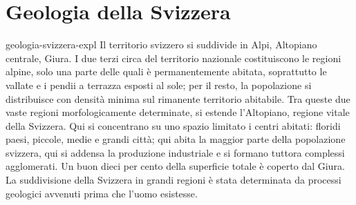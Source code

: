 \documentclass[preview]{standalone}
\begin{document}
\genpage

\section{Geologia della Svizzera}

\begin{snippet}{geologia-svizzera-expl}
    Il territorio svizzero si suddivide in Alpi, Altopiano centrale, Giura. I due terzi circa del territorio
    nazionale costituiscono le regioni alpine, solo una parte delle quali è permanentemente abitata,
    soprattutto le vallate e i pendii a terrazza esposti al sole; per il resto, la popolazione si distribuisce
    con densità minima sul rimanente territorio abitabile. Tra queste due vaste regioni
    morfologicamente determinate, si estende l'Altopiano, regione vitale della Svizzera. Qui si
    concentrano su uno spazio limitato i centri abitati: floridi paesi, piccole, medie e grandi città; qui
    abita la maggior parte della popolazione svizzera, qui si addensa la produzione industriale e si
    formano tuttora complessi agglomerati. Un buon dieci per cento della superficie totale è coperto
    dal Giura. La suddivisione della Svizzera in grandi regioni è stata determinata da processi geologici
    avvenuti prima che l'uomo esistesse.
\end{snippet}
\end{document}

